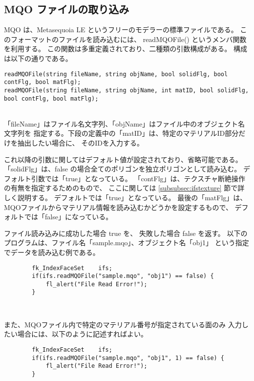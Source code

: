 \subsection{MQO ファイルの取り込み} \label{subsec:mqoread}
MQO は、Metasequoia LE というフリーのモデラーの標準ファイルである。
このフォーマットのファイルを読み込むには、
readMQOFile() というメンバ関数を利用する。
この関数は多重定義されており、二種類の引数構成がある。
構成は以下の通りである。
\\
\begin{screen}
\begin{small}
\begin{verbatim}
readMQOFile(string fileName, string objName, bool solidFlg, bool contFlg, bool matFlg);
readMQOFile(string fileName, string objName, int matID, bool solidFlg, bool contFlg, bool matFlg);
\end{verbatim}
\end{small}
\end{screen}
~ \\
「fileName」はファイル名文字列、「objName」はファイル中のオブジェクト名文字列を
指定する。下段の定義中の「matID」は、特定のマテリアルID部分だけを抽出したい場合に、
そのIDを入力する。

これ以降の引数に関してはデフォルト値が設定されており、省略可能である。
「solidFlg」は、false の場合全てのポリゴンを独立ポリゴンとして読み込む。
デフォルト引数では「true」となっている。
「contFlg」は、テクスチャ断絶操作の有無を指定するためのもので、
ここに関しては \ref{subsubsec:ifstexture} 節で詳しく説明する。
デフォルトでは「true」となっている。
最後の「matFlg」は、MQOファイルからマテリアル情報を読み込むかどうかを設定するもので、
デフォルトでは「false」になっている。

ファイル読み込みに成功した場合 true を、
失敗した場合 false を返す。
以下のプログラムは、ファイル名「sample.mqo」、オブジェクト名「obj1」
という指定でデータを読み込む例である。
\\
\begin{screen}
\begin{verbatim}
        fk_IndexFaceSet    ifs;
        if(ifs.readMQOFile("sample.mqo", "obj1") == false) {
            fl_alert("File Read Error!");
        }
\end{verbatim}
\end{screen} ~

また、MQOファイル内で特定のマテリアル番号が指定されている面のみ
入力したい場合には、以下のように記述すればよい。
\begin{screen}
\begin{verbatim}
        fk_IndexFaceSet    ifs;
        if(ifs.readMQOFile("sample.mqo", "obj1", 1) == false) {
            fl_alert("File Read Error!");
        }
\end{verbatim}
\end{screen} ~

